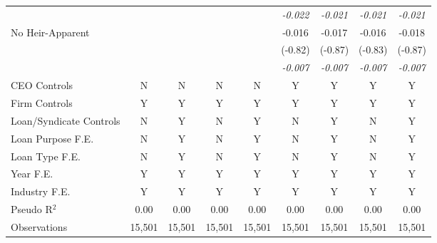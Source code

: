 {\begin{tabular}{l*{8}{c}}
                    &                     &                     &                     &                     &\textit{-0.022}         &\textit{-0.021}         &\textit{-0.021}         &\textit{-0.021}         \\
No Heir-Apparent  &                     &                     &                     &                     &      -0.016         &      -0.017         &      -0.016         &      -0.018         \\
                    &                     &                     &                     &                     &     (-0.82)         &     (-0.87)         &     (-0.83)         &     (-0.87)         \\
                    &                     &                     &                     &                     &\textit{-0.007}         &\textit{-0.007}         &\textit{-0.007}         &\textit{-0.007}         \\
\midrule CEO Controls        &           N         &           N         &           N         &           N         &           Y         &           Y         &           Y         &           Y         \\
Firm Controls       &           Y         &           Y         &           Y         &           Y         &           Y         &           Y         &           Y         &           Y         \\
Loan/Syndicate Controls&           N         &           Y         &           N         &           Y         &           N         &           Y         &           N         &           Y         \\
Loan Purpose F.E.   &           N         &           Y         &           N         &           Y         &           N         &           Y         &           N         &           Y         \\
Loan Type F.E.      &           N         &           Y         &           N         &           Y         &           N         &           Y         &           N         &           Y         \\
Year F.E.           &           Y         &           Y         &           Y         &           Y         &           Y         &           Y         &           Y         &           Y         \\
Industry F.E.       &           Y         &           Y         &           Y         &           Y         &           Y         &           Y         &           Y         &           Y         \\

Pseudo R$ ^2$       &        0.00         &        0.00         &        0.00         &        0.00         &        0.00         &        0.00         &        0.00         &        0.00         \\
Observations        &      15,501         &      15,501         &      15,501         &      15,501         &      15,501         &      15,501         &      15,501         &      15,501         \\
\bottomrule
\end{tabular}
}
